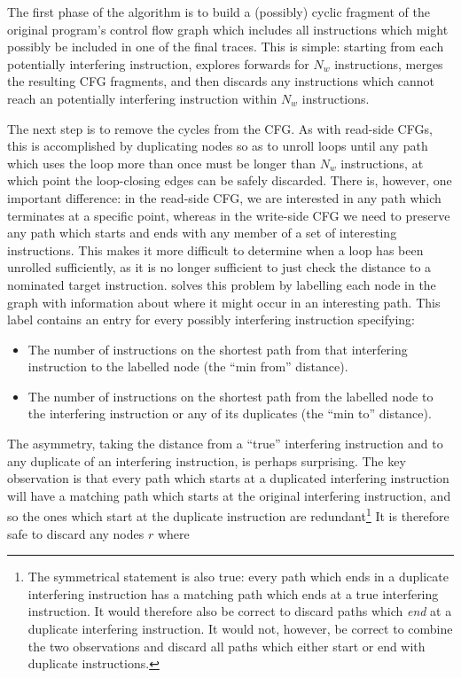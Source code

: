 The first phase of the algorithm is to build a (possibly) cyclic
fragment of the original program's control flow graph which includes
all instructions which might possibly be included in one of the final
traces.  This is simple: starting from each potentially interfering
instruction, {\technique} explores forwards for $N_w$ instructions,
merges the resulting CFG fragments, and then discards any instructions
which cannot reach an potentially interfering instruction within $N_w$
instructions.  

The next step is to remove the cycles from the CFG.  As with read-side
CFGs, this is accomplished by duplicating nodes so as to unroll loops
until any path which uses the loop more than once must be longer than
$N_w$ instructions, at which point the loop-closing edges can be
safely discarded.  There is, however, one important difference: in the
read-side CFG, we are interested in any path which terminates at a
specific point, whereas in the write-side CFG we need to preserve any
path which starts and ends with any member of a set of interesting
instructions.  This makes it more difficult to determine when a loop
has been unrolled sufficiently, as it is no longer sufficient to just
check the distance to a nominated target instruction.  {\Technique}
solves this problem by labelling each node in the graph with
information about where it might occur in an interesting path.  This
label contains an entry for every possibly interfering instruction
specifying:

\begin{itemize}
\item
  The number of instructions on the shortest path from that
  interfering instruction to the labelled node (the ``min from''
  distance).
\item
  The number of instructions on the shortest path from the labelled
  node to the interfering instruction or any of its duplicates (the
  ``min to'' distance).
\end{itemize}

The asymmetry, taking the distance from a ``true'' interfering
instruction and to any duplicate of an interfering instruction, is
perhaps surprising.  The key observation is that every path which
starts at a duplicated interfering instruction will have a matching
path which starts at the original interfering instruction, and so the
ones which start at the duplicate instruction are
redundant\footnote{The symmetrical statement is also true: every path
  which ends in a duplicate interfering instruction has a matching
  path which ends at a true interfering instruction.  It would
  therefore also be correct to discard paths which \emph{end} at a
  duplicate interfering instruction.  It would not, however, be
  correct to combine the two observations and discard all paths which
  either start or end with duplicate instructions.}  It is therefore
safe to discard any nodes $r$ where

